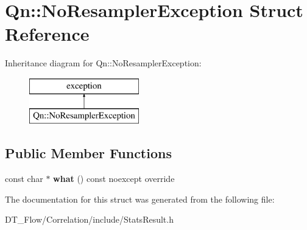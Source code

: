 \hypertarget{structQn_1_1NoResamplerException}{}\section{Qn\+:\+:No\+Resampler\+Exception Struct Reference}
\label{structQn_1_1NoResamplerException}
Inheritance diagram for Qn\+:\+:No\+Resampler\+Exception\+:\begin{figure}[H]
\begin{center}
\leavevmode
\includegraphics[height=2.000000cm]{structQn_1_1NoResamplerException}
\end{center}
\end{figure}
\subsection*{Public Member Functions}
\begin{DoxyCompactItemize}
\item 
\mbox{\label{structQn_1_1NoResamplerException_a4bac2d2e5129e8ce0bbb17c582589bed}} 
const char $\ast$ {\bfseries what} () const noexcept override
\end{DoxyCompactItemize}


The documentation for this struct was generated from the following file\+:\begin{DoxyCompactItemize}
\item 
D\+T\+\_\+\+Flow/\+Correlation/include/Stats\+Result.\+h\end{DoxyCompactItemize}
